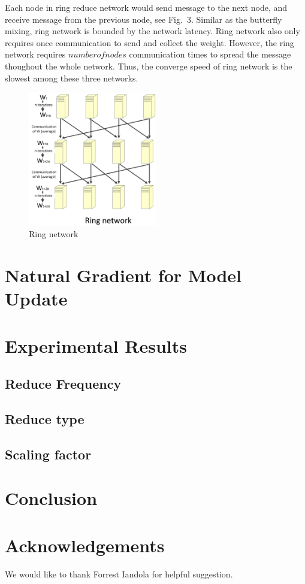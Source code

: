 \documentclass{article}
\begin{document}
Each node in ring reduce network would send message to the next node, and receive message from the previous node, see Fig.~3. Similar as the butterfly mixing, ring network is bounded by the network latency. Ring network also only requires once communication to send and collect the weight. However, the ring network requires $number of nodes$ communication times to spread the message thoughout the whole network. Thus, the converge speed of ring network is the slowest among these three networks. 
\begin{figure}[h!]
  
  \centering
    \includegraphics[width=0.5\textwidth]{ring.jpg}
    \caption{Ring network}
\end{figure}
\section{Natural Gradient for Model Update}

\section{Experimental Results}
\subsection{Reduce Frequency}

\subsection{Reduce type}

\subsection{Scaling factor}

\section{Conclusion}


\section{Acknowledgements}
We would like to thank Forrest Iandola for helpful suggestion.



\end{document}
